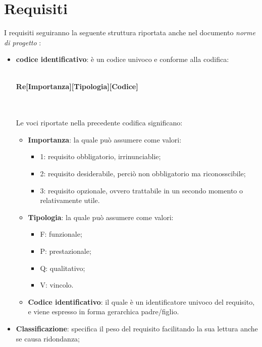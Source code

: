 \renewcommand{\arraystretch}{1.5}

\section{Requisiti} {
I requisiti seguiranno la seguente struttura riportata anche nel documento \emph{norme di progetto} :
				\begin{itemize}
					\item \textbf{codice identificativo}: è un codice univoco e conforme alla codifica: \\ \\
					\centerline{\textbf{Re[Importanza][Tipologia][Codice]}} \\ \\
					Le voci riportate nella precedente codifica significano: 
					\begin{itemize}
						\item \textbf{Importanza}: la quale può assumere come valori:
						\begin{itemize}
							\item 1: requisito obbligatorio, irrinunciablie;
							\item 2: requisito desiderabile, perciò non obbligatorio ma riconosscibile;
							\item 3: requisito opzionale, ovvero trattabile in un secondo momento o relativamente utile.
						\end{itemize}
						\item \textbf{Tipologia}: la quale può assumere come valori:
						\begin{itemize}
							\item F: funzionale;
							\item P: prestazionale;
							\item Q: qualitativo;
							\item V: vincolo.
						\end{itemize}
						\item \textbf{Codice identificativo}: il quale è un identificatore univoco del requisito, e viene espresso in forma gerarchica padre/figlio.
					\end{itemize}
					\item \textbf{Classificazione}: specifica il peso del requisito facilitando la sua lettura anche se causa ridondanza;

\end{itemize}}
